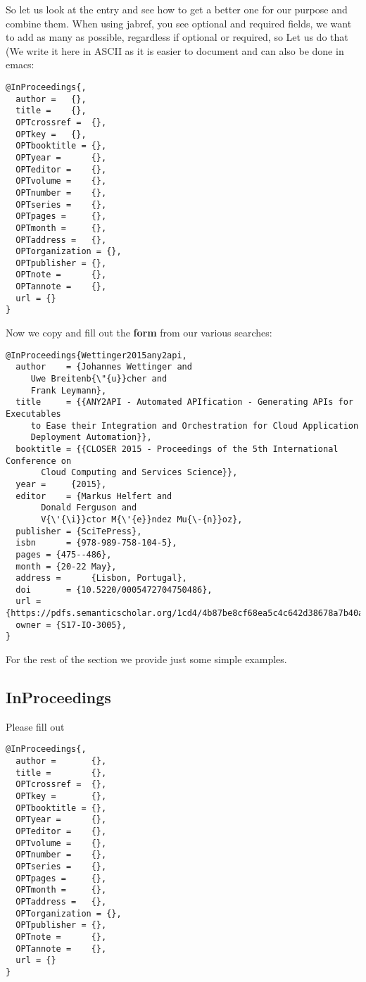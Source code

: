 So let us look at the entry and see how to get a better one for our
purpose and combine them. When using jabref, you see optional and
required fields, we want to add as many as possible, regardless if
optional or required, so Let us do that (We write it here in ASCII as it
is easier to document and can also be done in emacs:

\begin{verbatim}
@InProceedings{,
  author =   {},
  title =    {},
  OPTcrossref =  {},
  OPTkey =   {},
  OPTbooktitle = {},
  OPTyear =      {},
  OPTeditor =    {},
  OPTvolume =    {},
  OPTnumber =    {},
  OPTseries =    {},
  OPTpages =     {},
  OPTmonth =     {},
  OPTaddress =   {},
  OPTorganization = {},
  OPTpublisher = {},
  OPTnote =      {},
  OPTannote =    {},
  url = {}
}
\end{verbatim}

Now we copy and fill out the \textbf{form} from our various searches:

\begin{verbatim}
@InProceedings{Wettinger2015any2api,    
  author    = {Johannes Wettinger and
     Uwe Breitenb{\"{u}}cher and
     Frank Leymann},
  title     = {{ANY2API - Automated APIfication - Generating APIs for Executables
     to Ease their Integration and Orchestration for Cloud Application
     Deployment Automation}},
  booktitle = {{CLOSER 2015 - Proceedings of the 5th International Conference on
       Cloud Computing and Services Science}},
  year =     {2015},
  editor    = {Markus Helfert and
       Donald Ferguson and
       V{\'{\i}}ctor M{\'{e}}ndez Mu{\-{n}}oz},
  publisher = {SciTePress},
  isbn      = {978-989-758-104-5},
  pages = {475--486},
  month = {20-22 May},
  address =      {Lisbon, Portugal},
  doi       = {10.5220/0005472704750486},
  url ={https://pdfs.semanticscholar.org/1cd4/4b87be8cf68ea5c4c642d38678a7b40a86de.pdf},
  owner = {S17-IO-3005},
}
\end{verbatim}


For the rest of the section we provide just some simple examples.

\subsection{InProceedings}\label{s:e:inproceedings}

Please fill out

\begin{verbatim}
@InProceedings{,
  author =       {},
  title =        {},
  OPTcrossref =  {},
  OPTkey =       {},
  OPTbooktitle = {},
  OPTyear =      {},
  OPTeditor =    {},
  OPTvolume =    {},
  OPTnumber =    {},
  OPTseries =    {},
  OPTpages =     {},
  OPTmonth =     {},
  OPTaddress =   {},
  OPTorganization = {},
  OPTpublisher = {},
  OPTnote =      {},
  OPTannote =    {},
  url = {}
}
\end{verbatim}

